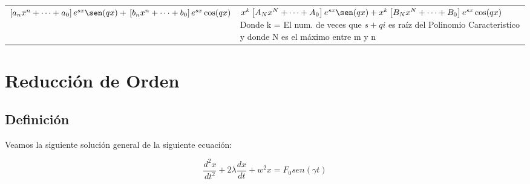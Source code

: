 \documentclass[12pt]{report}                               %
\begin{document}
\begin{longtable}{p{70mm} || p{90mm}}
         
            $\left[a_nx^n+\cdots+a_0\right]e^{sx}\sen(qx) +                                         \newline
            \left[b_nx^n+\cdots+b_0\right]e^{sx}\cos(qx)$                                           &

            $x^k \left[A_Nx^N+\cdots+A_0\right]e^{sx}\sen(qx) +                                     \newline
             x^k \left[B_Nx^N+\cdots+B_0\right]e^{sx}\cos(qx) $                                     \newline
            \tiny                                                                                   \newline
            \footnotesize Donde k = El num. de veces que $s+qi$ es raíz del
            Polinomio Caracteristico y donde N es el máximo entre m y n                             \\ [6.0ex]
         
        \end{longtable}






\chapter{Reducción de Orden}
    \clearpage

    \section{Definición}

        Veamos la siguiente solución general de la siguiente ecuación:

        \begin{equation}
            \frac{d^2 x}{dt^2} + 2 \lambda \frac{dx}{dt} + w^2 x = F_0 sen(\gamma t)
        \end{equation}
\end{document}
